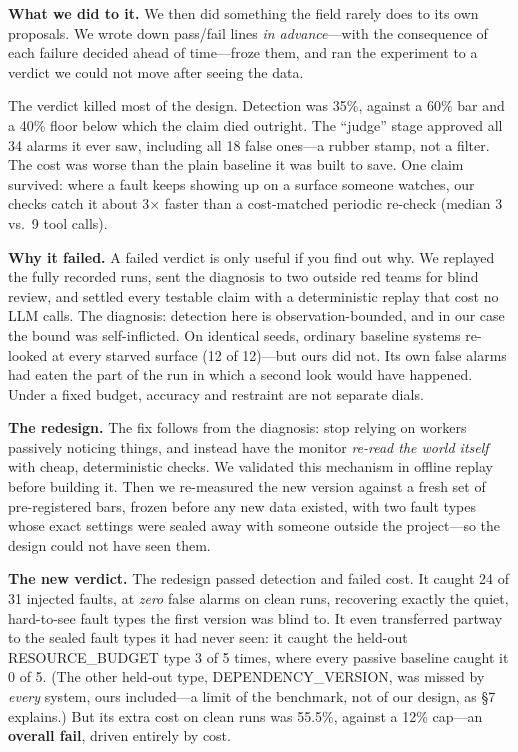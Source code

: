 \documentclass[acmsmall,screen]{acmart}
\begin{document}
\textbf{What we did to it.} We then did something the field rarely does to its
own proposals. We wrote down pass/fail lines \emph{in advance}---with the
consequence of each failure decided ahead of time---froze them, and ran the
experiment to a verdict we could not move after seeing the data.

The verdict killed most of the design. Detection was 35\%, against a 60\% bar
and a 40\% floor below which the claim died outright. The ``judge'' stage
approved all 34 alarms it ever saw, including all 18 false ones---a rubber
stamp, not a filter. The cost was worse than the plain baseline it was built to
save. One claim survived: where a fault keeps showing up on a surface someone
watches, our checks catch it about 3$\times$ faster than a cost-matched
periodic re-check (median 3 vs.\ 9 tool calls).

\textbf{Why it failed.} A failed verdict is only useful if you find out why. We
replayed the fully recorded runs, sent the diagnosis to two outside red teams
for blind review, and settled every testable claim with a deterministic replay
that cost no LLM calls. The diagnosis: detection here is observation-bounded,
and in our case the bound was self-inflicted. On identical seeds, ordinary
baseline systems re-looked at every starved surface (12 of 12)---but ours did
not. Its own false alarms had eaten the part of the run in which a second look
would have happened. Under a fixed budget, accuracy and restraint are not
separate dials.

\textbf{The redesign.} The fix follows from the diagnosis: stop relying on
workers passively noticing things, and instead have the monitor \emph{re-read
the world itself} with cheap, deterministic checks. We validated this mechanism
in offline replay before building it. Then we re-measured the new version
against a fresh set of pre-registered bars, frozen before any new data existed,
with two fault types whose exact settings were sealed away with someone outside
the project---so the design could not have seen them.

\textbf{The new verdict.} The redesign passed detection and failed cost. It
caught 24 of 31 injected faults, at \emph{zero} false alarms on clean runs,
recovering exactly the quiet, hard-to-see fault types the first version was
blind to. It even transferred partway to the sealed fault types it had never
seen: it caught the held-out RESOURCE\_BUDGET type 3 of 5 times, where every
passive baseline caught it 0 of 5. (The other held-out type,
DEPENDENCY\_VERSION, was missed by \emph{every} system, ours included---a limit
of the benchmark, not of our design, as \S7 explains.) But its extra cost on
clean runs was 55.5\%, against a 12\% cap---an \textbf{overall fail}, driven
entirely by cost.
\end{document}

